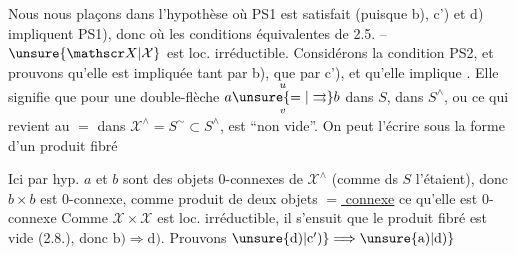
Nous nous plaçons  dans l'hypothèse où PS1 est satisfait (puisque b), c') et d) impliquent PS1), donc où  les conditions équivalentes de 2.5. -- $\unsure{\mathscr X|\mathcal X}$ est loc. irréductible. Considérons  la condition PS2, et prouvons qu'elle est impliquée tant par b), que par c'), et qu'elle implique . Elle signifie que pour une double-flèche $a\overset{u}{\underset{v}{\unsure{=|\rightrightarrows}}}b$ dans $S$,    dans $S^\wedge$, ou ce qui revient au $=$ dans $\mathscr X^\wedge=S^\sim\subset S^\wedge$, est ``non vide''. On peut l'écrire sous la forme d'un produit fibré


Ici par hyp. $a$ et $b$ sont des objets $0$-connexes de $\mathscr X^\wedge$ (comme ds $S$ l'étaient),   donc $b\times b$ est  $0$-connexe, comme produit de deux objets   \uline{$=$  connexe} ce qu'elle est  $0$-connexe\unsure{;} Comme $\mathscr X\times\mathscr X$ est loc. irréductible, il s'ensuit que le produit fibré est  vide (2.8.), donc $\mathrm{b)}\Longrightarrow\mathrm{d)}$. Prouvons $\unsure{\mathrm{d)}|\mathrm{c')}}\Longrightarrow\unsure{\mathrm{a)}|\mathrm{d)}}$  

